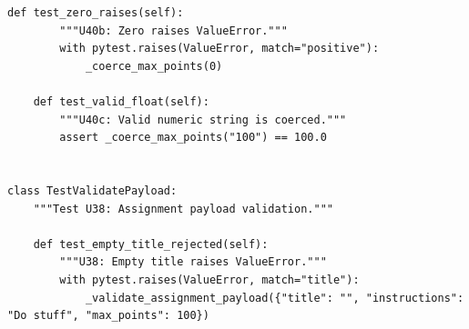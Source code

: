 \documentclass[12pt, letterpaper]{article}
\begin{document}
\begin{lstlisting}[style=pythonstyle]
    def test_zero_raises(self):
        """U40b: Zero raises ValueError."""
        with pytest.raises(ValueError, match="positive"):
            _coerce_max_points(0)

    def test_valid_float(self):
        """U40c: Valid numeric string is coerced."""
        assert _coerce_max_points("100") == 100.0


class TestValidatePayload:
    """Test U38: Assignment payload validation."""

    def test_empty_title_rejected(self):
        """U38: Empty title raises ValueError."""
        with pytest.raises(ValueError, match="title"):
            _validate_assignment_payload({"title": "", "instructions": "Do stuff", "max_points": 100})
\end{lstlisting}
\end{document}
